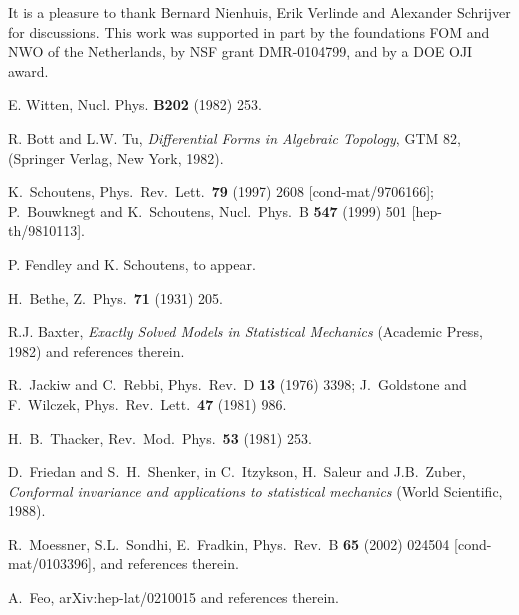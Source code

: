\documentclass[a4paper,prl,aps,twocolumn]{revtex4}
\begin{document}
It is a pleasure to thank Bernard Nienhuis, Erik Verlinde and 
Alexander Schr\-ijver for discussions. 
This work was supported in part by the foundations FOM and NWO 
of the Netherlands, by NSF grant DMR-0104799, and by a DOE OJI award. 
  
\vskip 3mm  
  
\begin{thebibliography}{99}  
  
E. Witten, Nucl. Phys. \textbf{B202} (1982) 253.  

 
R. Bott and L.W. Tu, {\it Differential Forms in Algebraic Topology},
GTM 82, (Springer Verlag, New York, 1982).

  

K.~Schoutens,
Phys.\ Rev.\ Lett.\  {\bf 79} (1997) 2608
[cond-mat/9706166];
P.~Bouwknegt and K.~Schoutens,
Nucl.\ Phys.\ B {\bf 547} (1999) 501
[hep-th/9810113].
 
P. Fendley and K. Schoutens, to appear.  
  
H.~Bethe,  
Z.\ Phys.\  {\bf 71} (1931) 205.
  
R.J. Baxter, {\it Exactly Solved Models in Statistical  
Mechanics} (Academic Press, 1982) and references therein.  
  
  R.~Jackiw and C.~Rebbi,  
Phys.\ Rev.\ D {\bf 13} (1976) 3398;  
J.~Goldstone and F.~Wilczek,  
Phys.~Rev.~Lett.\  {\bf 47} (1981) 986.  
  
 H.~B.~Thacker,  
Rev.\ Mod.\ Phys.\  {\bf 53} (1981) 253.  
  
D.~Friedan and S.~H.~Shenker,   
in  
C.~Itzykson, H.~Saleur and J.B.~Zuber,  
{\it Conformal invariance and applications to statistical mechanics} %
(World Scientific, 1988).  
    
R.~Moessner, S.L.~Sondhi, E.~Fradkin,  
Phys.\ Rev.\ B {\bf 65} (2002) 024504 [cond-mat/0103396],
and references therein.  
  
A.~Feo,
arXiv:hep-lat/0210015 and references therein.


\end{thebibliography}  
  
\end{document}
